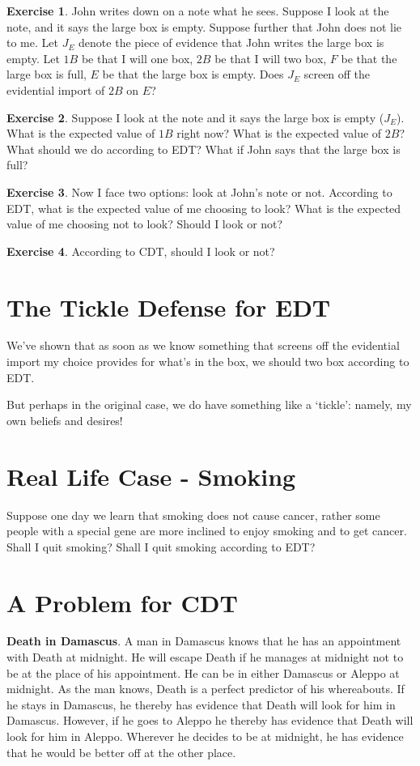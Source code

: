 \documentclass[12pt]{article}
\theoremstyle{definition}
\newtheorem{exer}{Exercise}
\begin{document}
\begin{exer}
John writes down on a note what he sees. Suppose I look at the note, and it says the large box is empty. Suppose further that John does not lie to me. Let $J_E$ denote the piece of evidence that John writes the large box is empty. 
Let $1B$ be that I will one box, $2B$ be that I will two box, $F$ be that the large box is full, $E$ be that the large box is empty.
Does $J_E$ screen off the evidential import of $2B$ on $E$?
\end{exer}

\begin{exer}
Suppose I look at the note and it says the large box is empty ($J_E$). What is the expected value of $1B$ right now? What is the expected value of $2B$? What should we do according to EDT? What if John says that the large box is full?
\end{exer}

\begin{exer}
Now I face two options: look at John's note or not. According to EDT, what is the expected value of me choosing to look? What is the expected value of me choosing not to look? Should I look or not?
\end{exer}

\begin{exer}
According to CDT, should I look or not?
\end{exer}

\section{The Tickle Defense for EDT}

We've shown that as soon as we know something that screens off the evidential import my choice provides for what's in the box, we should two box according to EDT. 

\noindent
But perhaps in the original case, we do have something like a `tickle': namely, my own beliefs and desires!

\section{Real Life Case - Smoking}

Suppose one day we learn that smoking does not cause cancer, rather some people with a special gene are more inclined to enjoy smoking and to get cancer. Shall I quit smoking? Shall I quit smoking according to EDT?

\section{A Problem for CDT}

\textbf{Death in Damascus}. A man in Damascus knows that he has an appointment with Death at midnight. He will escape Death if he manages at midnight not to be at the place of his appointment. He can be in either Damascus or Aleppo at midnight. As the man knows, Death is a perfect predictor of his whereabouts. If he stays in Damascus, he thereby has evidence that Death will look for him in Damascus. However, if he goes to Aleppo he thereby has evidence that Death will look for him in Aleppo. Wherever he decides to be at midnight, he has evidence that he would be better off at the other place.
\end{document}
